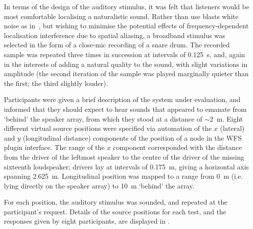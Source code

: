 In terms of the design of the auditory stimulus, it was felt that listeners
would be most comfortable localising a naturalistic sound.
Rather than use blasts white noise as in~\citep[ch.~6]{verheijen_sound_1998},
but wishing to minimise the potential effects of frequency-dependent
localisation interference due to spatial aliasing, a broadband stimulus
was selected in the form of a close-mic recording of a snare drum.
The recorded sample was repeated three times in succession at intervals of
\qty{.125}{\s}, and, again in the interests of adding a natural quality to the
sound, with slight variations in amplitude (the second iteration of the sample
was played marginally quieter than the first; the third slightly louder).

Participants were given a brief description of the system under evaluation,
and informed that they should expect to hear sounds that appeared to emanate
from `behind' the speaker array, from which they stood at a distance of
$\sim$\qty{2}{\m}.
Eight different virtual source positions were specified via automation of the
$x$ (lateral) and $y$ (longitudinal distance) components of the position of a
node in the WFS plugin interface.
The range of the $x$ component corresponded with the distance from the driver
of the leftmost speaker to the centre of the driver of the missing sixteenth
loudspeaker; drivers lay at intervals of \qty{.175}{\m}, giving a horizontal
axis spanning \qty{2.625}{\m}.
Longitudinal position was mapped to a range from \qty{0}{\m} (i.e. lying
directly on the speaker array) to \qty{10}{\m} `behind' the array.

For each position, the auditory stimulus was sounded, and repeated at the
participant's request.
Details of the source positions for each test, and the responses given by
eight participants, are displayed in .

